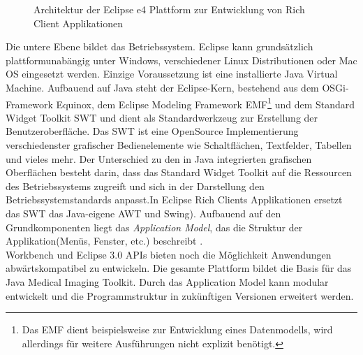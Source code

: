 \begin{figure}[htbp]
  \vspace{0.5cm}
  \centering
  \caption{Architektur der Eclipse e4 Plattform zur Entwicklung von Rich Client Applikationen \cite{e4:screen}}
  \label{eclipsee4arch}
  \vspace{0.5cm}
\end{figure}

Die untere Ebene bildet das Betriebssystem. Eclipse kann grundsätzlich plattformunabängig unter Windows, verschiedener Linux Distributionen oder Mac OS eingesetzt werden. Einzige Voraussetzung ist eine installierte Java Virtual Machine. Aufbauend auf Java steht der Eclipse-Kern, bestehend aus dem OSGi-Framework Equinox, dem Eclipse Modeling Framework EMF\footnote{Das EMF dient beispielsweise zur Entwicklung eines Datenmodells, wird allerdings für weitere Ausführungen nicht explizit benötigt.} und dem Standard Widget Toolkit SWT und dient als Standardwerkzeug zur Erstellung der Benutzeroberfläche. Das SWT ist eine OpenSource Implementierung verschiedenster grafischer Bedienelemente wie Schaltflächen, Textfelder, Tabellen und vieles mehr. Der Unterschied zu den in Java integrierten grafischen Oberflächen besteht darin, dass das Standard Widget Toolkit auf die Ressourcen des Betriebssystems zugreift und sich in der Darstellung den Betriebssystemstandards anpasst\cite{eclipse:swt}.In Eclipse Rich Clients Applikationen ersetzt das SWT das Java-eigene AWT und Swing). Aufbauend auf den Grundkomponenten liegt das \textit{Application Model}, das die Struktur der Applikation(Menüs, Fenster, etc.) beschreibt \cite[Kapitel 7]{vogel:e4overview}.\\
Workbench und Eclipse 3.0 APIs bieten noch die Möglichkeit Anwendungen abwärtskompatibel zu entwickeln. Die gesamte Plattform bildet die Basis für das Java Medical Imaging Toolkit. Durch das Application Model kann modular entwickelt und die Programmstruktur in zukünftigen Versionen erweitert werden.

